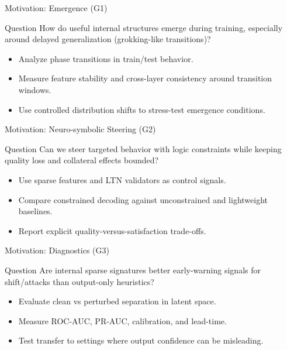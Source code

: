 \begin{frame}{Motivation: Emergence (G1)}
    \small
    \begin{block}{Question}
        How do useful internal structures emerge during training, especially around delayed generalization (grokking-like transitions)?
    \end{block}
    
    \begin{itemize}
        \item Analyze phase transitions in train/test behavior.
        \item Measure feature stability and cross-layer consistency around transition windows.
        \item Use controlled distribution shifts to stress-test emergence conditions.
    \end{itemize}
\end{frame}

\begin{frame}{Motivation: Neuro-symbolic Steering (G2)}
    \small
    \begin{block}{Question}
        Can we steer targeted behavior with logic constraints while keeping quality loss and collateral effects bounded?
    \end{block}
    \begin{itemize}
        \item Use sparse features and LTN validators as control signals.
        \item Compare constrained decoding against unconstrained and lightweight baselines.
        \item Report explicit quality-versus-satisfaction trade-offs.
    \end{itemize}
\end{frame}

\begin{frame}{Motivation: Diagnostics (G3)}
    \small
    \begin{block}{Question}
        Are internal sparse signatures better early-warning signals for shift/attacks than output-only heuristics?
    \end{block}
    \begin{itemize}
        \item Evaluate clean vs perturbed separation in latent space.
        \item Measure ROC-AUC, PR-AUC, calibration, and lead-time.
        \item Test transfer to settings where output confidence can be misleading.
    \end{itemize}
\end{frame}

